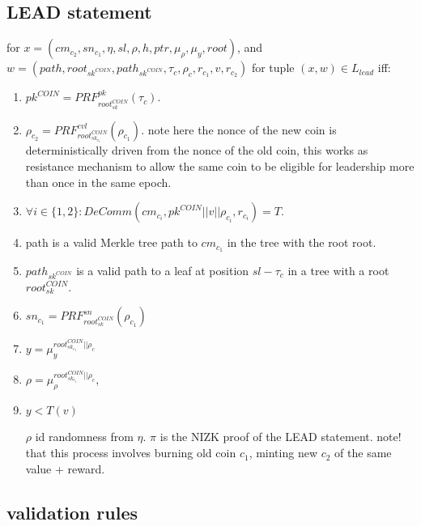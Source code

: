 \documentclass[a4paper]{article}
\begin{document}
\subsection{ LEAD statement}
for $x=(cm_{c_2},sn_{c_1},\eta,sl,\rho,h,ptr,\mu_{\rho},\mu_{y},root)$, and
\newline
$w=(path,root_{sk^{COIN}},path_{sk^{COIN}},\tau_c,\rho_c,r_{c_1},v,r_{c_2})$
for tuple $(x,w) \in L_{lead}$ iff:
\begin{enumerate}
 \item $pk^{COIN} = PRF_{root_{sk}^{COIN}}^{pk}(\tau_c)$.
 \item $\rho_{c_2}=PRF_{root_{sk_{c_1}}^{COIN}}^{evl}(\rho_{c_1})$.
 note here the nonce of the new coin is deterministically driven from the nonce of the old coin, this works as resistance mechanism to allow the same coin to be eligible for leadership more than once in the same epoch.
 \item $\forall i \in \{1,2\} : DeComm(cm_{c_i},pk^{COIN}||v||\rho_{c_i},r_{c_i})=T$.
 \item path is a valid Merkle tree path to $cm_{c_1}$ in the tree with the root root.
 \item $path_{sk^{COIN}}$ is a valid path to a leaf at position $sl-\tau_c$ in a tree with a root $root_{sk}^{COIN}$.
 \item $sn_{c_1}= PRF_{root_{sk}^{COIN}}^{sn}(\rho_{c_1})$
 \item $y = \mu_{y}^{root_{sk_{c_1}}^{COIN}||\rho_c}$
 \item $\rho = \mu_{\rho}^{root_{sk_{c_1}}^{COIN}||\rho_c}$,

 \item $y< T(v)$

   $\rho$ id randomness from $\eta$.  $\pi$ is the NIZK proof of the LEAD statement.
   note! that this process involves burning old coin $c_1$, minting new  $c_2$ of the same value + reward.

\end{enumerate}
\subsection{ validation rules}
\end{document}
